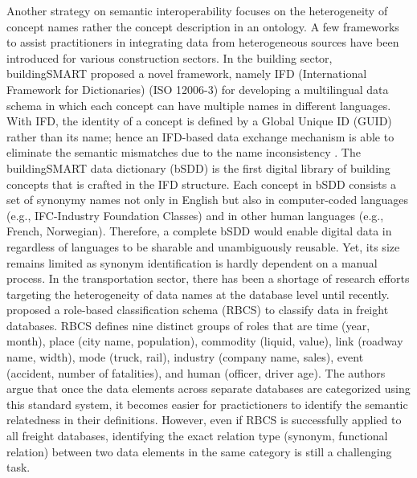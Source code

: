 \documentclass[Journal, BackFigs, DoubleSpace]{ascelike}%
\begin{document}
Another strategy on semantic interoperability focuses on the heterogeneity of concept names rather the concept description in an ontology. A few frameworks to assist practitioners in integrating data from heterogeneous sources have been introduced for various construction sectors. In the building sector, buildingSMART proposed a novel framework, namely IFD (International Framework for Dictionaries) (ISO 12006-3) for developing a multilingual data schema in which each concept can have multiple names in different languages. With IFD, the identity of a concept is defined by a Global Unique ID (GUID) rather than its name; hence an IFD-based data exchange mechanism is able to eliminate the semantic mismatches due to the name inconsistency \cite{IFDgroup08,hezik08}. The buildingSMART data dictionary (bSDD) \cite{buildingsmartData} is the first digital library of building concepts that is crafted in the IFD structure. Each concept in bSDD consists a set of synonymy names not only in English but also in computer-coded languages (e.g., IFC-Industry Foundation Classes) and in other human languages (e.g., French, Norwegian). Therefore, a complete bSDD would enable digital data in regardless of languages to be sharable and unambiguously reusable. Yet, its size remains limited as synonym identification is hardly dependent on a manual process. In the transportation sector, there has been a shortage of research efforts targeting the heterogeneity of data names at the database level until recently.   proposed a role-based classification schema (RBCS) to classify data in freight databases. RBCS defines nine distinct groups of roles that are time (year, month), place (city name, population), commodity (liquid, value), link (roadway name, width), mode (truck, rail), industry (company name, sales), event (accident, number of fatalities), and human (officer, driver age). The authors argue that once the data elements across separate databases are categorized using this standard system, it becomes easier for practictioners to identify the semantic relatedness in their definitions. However, even if RBCS is successfully applied to all freight databases, identifying the exact relation type (synonym, functional relation) between two data elements in the same category is still a challenging task.
\par
\end{document}
